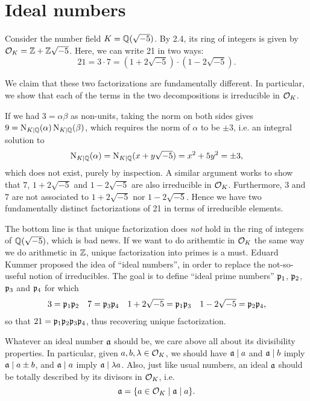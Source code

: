 \section{Ideal numbers}

Consider the number field $K=\mathbb{Q}(\sqrt{-5})$. By 2.4, its ring of integers is given by $\mathcal{O}_K=\mathbb{Z}+\mathbb{Z}\sqrt{-5}$. Here, we can write 21 in two ways:
\[
	21 = 3\cdot 7 = (1+2\sqrt{-5})\cdot(1-2\sqrt{-5}).
\]

We claim that these two factorizations are fundamentally different. In particular, we show that each of the terms in the two decompositions is irreducible in $\mathcal{O}_K$.

If we had $3=\alpha\beta$ as non-units, taking the norm on both sides gives $9=\operatorname{N}_{K\mid\mathbb{Q}}(\alpha)\operatorname{N}_{K\mid\mathbb{Q}}(\beta)$, which requires the norm of $\alpha$ to be $\pm 3$, i.e. an integral solution to
\[
	\operatorname{N}_{K\mid\mathbb{Q}}(\alpha) = \operatorname{N}_{K\mid\mathbb{Q}}(x + y\sqrt{-5}) = x^2 +5y^2 = \pm 3,
\]
which does not exist, purely by inspection. A similar argument works to show that $7$, $1+2\sqrt{-5}$ and $1-2\sqrt{-5}$ are also irreducible in $\mathcal{O}_K$. Furthermore, 3 and 7 are not associated to $1+2\sqrt{-5}$ nor $1-2\sqrt{-5}$. Hence we have two fundamentally distinct factorizations of 21 in terms of irreducible elements.

The bottom line is that unique factorization does \emph{not} hold in the ring of integers of $\mathbb{Q}(\sqrt{-5})$, which is bad news. If we want to do arithemtic in $\mathcal{O}_K$ the same way we do arithmetic in $\mathbb{Z}$, unique factorization into primes is a must. Eduard Kummer proposed the idea of ``ideal numbers'', in order to replace the not-so-useful notion of  irreducibles. The goal is to define ``ideal prime numbers'' $\mathfrak{p}_1$, $\mathfrak{p}_2$, $\mathfrak{p}_3$ and $\mathfrak{p}_4$ for which
\begin{align*}
	3 = \mathfrak{p}_1\mathfrak{p}_2 && 7 = \mathfrak{p}_3\mathfrak{p}_4 && 1+2\sqrt{-5} = \mathfrak{p}_1\mathfrak{p}_3 && 1-2\sqrt{-5} = \mathfrak{p}_2\mathfrak{p}_4,
\end{align*}
so that $21 = \mathfrak{p}_1\mathfrak{p}_2\mathfrak{p}_3\mathfrak{p}_4$, thus recovering unique factorization.

Whatever an ideal number $\mathfrak{a}$ should be, we care above all about its divisibility properties. In particular, given $a,b,\lambda\in\mathcal{O}_K$, we should have $\mathfrak{a}\mid a$ and $\mathfrak{a}\mid b$ imply $\mathfrak{a}\mid a\pm b$, and $\mathfrak{a}\mid a$ imply $\mathfrak{a}\mid\lambda a$. Also, just like usual numbers, an ideal $\mathfrak{a}$ should be totally described by its divisors in $\mathcal{O}_K$, i.e.
\[
	\mathfrak{a} = \{a\in\mathcal{O}_K\mid\mathfrak{a}\mid a\}.
\]

